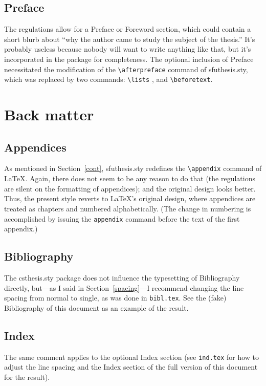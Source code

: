 \subsection{Preface}

The regulations allow for a Preface or
Foreword section, which could contain a short blurb about ``why the
author came to study the subject of the thesis.'' It's probably
useless because nobody will want to write anything like that, but it's
incorporated in the package for completeness. The optional inclusion
of Preface necessitated the modification of the \verb+\afterpreface+%
command of
\textsf{sfuthesis.sty},
which was replaced by two commands: \verb+\lists+%
, and
\verb+\beforetext+.

\section{Back matter}

\subsection{Appendices}

As mentioned in Section~\ref{cont},
\textsf{sfuthesis.sty}
redefines the \verb+\appendix+%
 command of \LaTeX.
Again, there does not seem to be any reason to do that (the
regulations are silent on the formatting of appendices); and the
original design looks better.  Thus, the present style reverts to
\LaTeX's original design, where appendices are treated as chapters and
numbered alphabetically. (The change in numbering is accomplished by
issuing the
\verb+appendix+ command
before the text of the first appendix.)

\subsection{Bibliography}

The \textsf{csthesis.sty}
package does not influence the typesetting of Bibliography directly,
but---as I said in Section~\ref{spacing}---I recommend changing the
line spacing from normal to single, as
was done in \texttt{bibl.tex}.
See the (fake) Bibliography of this document as an example of the
result.

\subsection{Index}

The same comment applies to the optional Index section (see
\texttt{ind.tex} for how to
adjust the line spacing and the Index section
of the full version of this document for the result).



